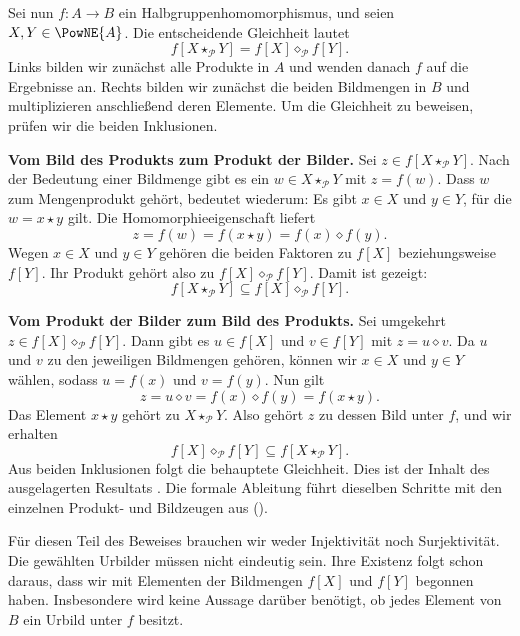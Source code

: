 Sei nun \(f\colon A\to B\) ein Halbgruppenhomomorphismus, und seien
\(X,Y\in\PowNE{A}\). Die entscheidende Gleichheit lautet
\[
  \boxed{f[X\star_{\mathcal P}Y]
    =f[X]\diamond_{\mathcal P}f[Y].}
\]
Links bilden wir zunächst alle Produkte in \(A\) und wenden danach
\(f\) auf die Ergebnisse an. Rechts bilden wir zunächst die beiden
Bildmengen in \(B\) und multiplizieren anschließend deren Elemente.
Um die Gleichheit zu beweisen, prüfen wir die beiden Inklusionen.

\medskip\noindent\textbf{Vom Bild des Produkts zum Produkt der Bilder.}
Sei \(z\in f[X\star_{\mathcal P}Y]\). Nach der Bedeutung einer
Bildmenge gibt es ein \(w\in X\star_{\mathcal P}Y\) mit \(z=f(w)\).
Dass \(w\) zum Mengenprodukt gehört, bedeutet wiederum: Es gibt
\(x\in X\) und \(y\in Y\), für die \(w=x\star y\) gilt.
Die Homomorphieeigenschaft liefert
\[
  z=f(w)=f(x\star y)=f(x)\diamond f(y).
\]
Wegen \(x\in X\) und \(y\in Y\) gehören die beiden Faktoren zu
\(f[X]\) beziehungsweise \(f[Y]\). Ihr Produkt gehört also zu
\(f[X]\diamond_{\mathcal P}f[Y]\). Damit ist gezeigt:
\[
  f[X\star_{\mathcal P}Y]
    \subseteq f[X]\diamond_{\mathcal P}f[Y].
\]

\medskip\noindent\textbf{Vom Produkt der Bilder zum Bild des Produkts.}
Sei umgekehrt \(z\in f[X]\diamond_{\mathcal P}f[Y]\). Dann gibt es
\(u\in f[X]\) und \(v\in f[Y]\) mit \(z=u\diamond v\).
Da \(u\) und \(v\) zu den jeweiligen Bildmengen gehören, können wir
\(x\in X\) und \(y\in Y\) wählen, sodass \(u=f(x)\) und \(v=f(y)\).
Nun gilt
\[
  z=u\diamond v=f(x)\diamond f(y)=f(x\star y).
\]
Das Element \(x\star y\) gehört zu \(X\star_{\mathcal P}Y\).
Also gehört \(z\) zu dessen Bild unter \(f\), und wir erhalten
\[
  f[X]\diamond_{\mathcal P}f[Y]
    \subseteq f[X\star_{\mathcal P}Y].
\]
Aus beiden Inklusionen folgt die behauptete Gleichheit. Dies ist der
Inhalt des ausgelagerten Resultats
.
Die formale Ableitung führt dieselben Schritte mit den einzelnen
Produkt- und Bildzeugen aus
().

Für diesen Teil des Beweises brauchen wir weder Injektivität noch
Surjektivität. Die gewählten Urbilder müssen nicht eindeutig sein.
Ihre Existenz folgt schon daraus, dass wir mit Elementen der
Bildmengen \(f[X]\) und \(f[Y]\) begonnen haben. Insbesondere wird
keine Aussage darüber benötigt, ob jedes Element von \(B\) ein
Urbild unter \(f\) besitzt.

\clearpage

